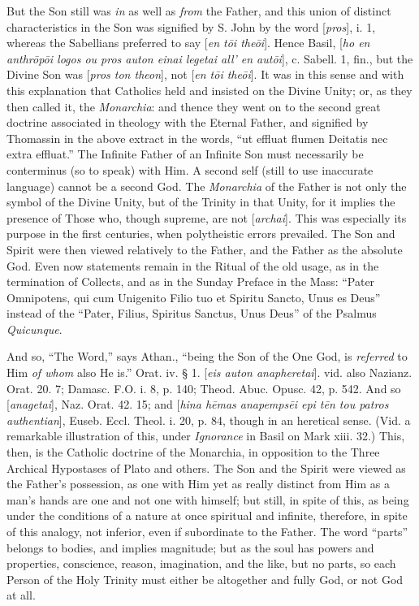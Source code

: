 But the Son still was \emph{in} as well as \emph{from}
the Father, and this union of distinct characteristics in the Son was
signified by S. John by the word [\emph{pros}], i. 1, whereas the
Sabellians preferred to say [\emph{en t\={o}i the\={o}i}].
Hence Basil, [\emph{ho en
anthr\={o}p\={o}i logos ou pros auton einai legetai all}\emph{'
en aut\={o}i}], c.
Sabell. 1, fin., but the Divine Son was [\emph{pros ton theon}], not [\emph{en
t\={o}i the\={o}i}]. It was in this sense and with this
explanation that Catholics held and insisted on the Divine Unity; or,
as they then called it, the \emph{Monarchia}: and thence they went on
to the second great doctrine associated in theology with the Eternal
Father, and signified by Thomassin in the above extract in the words, ``ut
effluat flumen Deitatis nec extra effluat.'' The Infinite Father of an
Infinite Son must necessarily be conterminus (so to speak) with Him. A
second self (still to use inaccurate language) cannot be a second God.
The \emph{Monarchia} of the Father is not only the symbol of the
Divine Unity, but of the Trinity in that Unity, for it implies the
presence of Those who, though supreme, are not [\emph{archai}]. This
was especially its purpose in the first centuries, when polytheistic
errors prevailed. The Son and Spirit were then viewed relatively to
the Father, and the Father as the absolute God. Even now statements
remain in the Ritual of the old usage, as in the termination of
Collects, and as in the Sunday Preface in the Mass: ``Pater Omnipotens,
qui cum Unigenito Filio tuo et Spiritu Sancto, Unus es Deus'' instead
of the ``Pater, Filius, Spiritus Sanctus, Unus Deus'' of the Psalmus \emph{Quicunque}.

And so, ``The Word,'' says Athan., ``being the Son
of the One God, is \emph{referred} to Him \emph{of whom} also He is.''
Orat. iv. § 1. [\emph{eis auton anapheretai}]. vid. also Nazianz.
Orat. 20. 7; Damasc. F.O. i. 8, p. 140; Theod. Abuc. Opusc. 42, p.
542. And so [\emph{anagetai}], Naz. Orat. 42. 15; and [\emph{hina h\={e}mas
anapemps\={e}i epi t\={e}n tou patros authentian}], Euseb.
Eccl. Theol. i. 20, p. 84, though in an heretical sense. (Vid. a
remarkable illustration of this, under \emph{Ignorance} in Basil on
Mark xiii. 32.) This, then, is the Catholic doctrine of the Monarchia,
in opposition to the Three Archical Hypostases of Plato and others.
The Son and the Spirit were viewed as the Father's possession, as one
with Him yet as really distinct from Him as a man's hands are one and
not one with himself; but still, in spite of this, as being under the
conditions of a nature at once spiritual and infinite, therefore, in
spite of this analogy, not inferior, even if subordinate to the
Father. The word ``parts'' belongs to bodies, and implies magnitude; but
as the soul has powers and properties, conscience, reason,
imagination, and the like, but no parts, so each Person of the Holy
Trinity must either be altogether and fully God, or not God at all.


